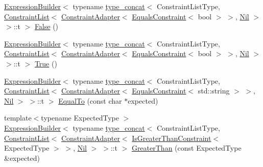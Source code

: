 \begin{DoxyCompactItemize}
\item 
\mbox{\hyperlink{structsnowhouse_1_1ExpressionBuilder}{Expression\+Builder}}$<$ typename \mbox{\hyperlink{structsnowhouse_1_1type__concat}{type\+\_\+concat}}$<$ Constraint\+List\+Type, \mbox{\hyperlink{structsnowhouse_1_1ConstraintList}{Constraint\+List}}$<$ \mbox{\hyperlink{structsnowhouse_1_1ConstraintAdapter}{Constraint\+Adapter}}$<$ \mbox{\hyperlink{structsnowhouse_1_1EqualsConstraint}{Equals\+Constraint}}$<$ bool $>$ $>$, \mbox{\hyperlink{structsnowhouse_1_1Nil}{Nil}} $>$ $>$\+::t $>$ \mbox{\hyperlink{structsnowhouse_1_1ExpressionBuilder_a4d6100ada93a921ef65929572ac7a2d1}{False}} ()
\item 
\mbox{\hyperlink{structsnowhouse_1_1ExpressionBuilder}{Expression\+Builder}}$<$ typename \mbox{\hyperlink{structsnowhouse_1_1type__concat}{type\+\_\+concat}}$<$ Constraint\+List\+Type, \mbox{\hyperlink{structsnowhouse_1_1ConstraintList}{Constraint\+List}}$<$ \mbox{\hyperlink{structsnowhouse_1_1ConstraintAdapter}{Constraint\+Adapter}}$<$ \mbox{\hyperlink{structsnowhouse_1_1EqualsConstraint}{Equals\+Constraint}}$<$ bool $>$ $>$, \mbox{\hyperlink{structsnowhouse_1_1Nil}{Nil}} $>$ $>$\+::t $>$ \mbox{\hyperlink{structsnowhouse_1_1ExpressionBuilder_a6fbd324a200c305ed4fe83aa1143a7ab}{True}} ()
\item 
\mbox{\hyperlink{structsnowhouse_1_1ExpressionBuilder}{Expression\+Builder}}$<$ typename \mbox{\hyperlink{structsnowhouse_1_1type__concat}{type\+\_\+concat}}$<$ Constraint\+List\+Type, \mbox{\hyperlink{structsnowhouse_1_1ConstraintList}{Constraint\+List}}$<$ \mbox{\hyperlink{structsnowhouse_1_1ConstraintAdapter}{Constraint\+Adapter}}$<$ \mbox{\hyperlink{structsnowhouse_1_1EqualsConstraint}{Equals\+Constraint}}$<$ std\+::string $>$ $>$, \mbox{\hyperlink{structsnowhouse_1_1Nil}{Nil}} $>$ $>$\+::t $>$ \mbox{\hyperlink{structsnowhouse_1_1ExpressionBuilder_af4bface30b14ef54c89f50dcd9bc38c5}{Equal\+To}} (const char $\ast$expected)
\item 
{\footnotesize template$<$typename Expected\+Type $>$ }\\\mbox{\hyperlink{structsnowhouse_1_1ExpressionBuilder}{Expression\+Builder}}$<$ typename \mbox{\hyperlink{structsnowhouse_1_1type__concat}{type\+\_\+concat}}$<$ Constraint\+List\+Type, \mbox{\hyperlink{structsnowhouse_1_1ConstraintList}{Constraint\+List}}$<$ \mbox{\hyperlink{structsnowhouse_1_1ConstraintAdapter}{Constraint\+Adapter}}$<$ \mbox{\hyperlink{structsnowhouse_1_1IsGreaterThanConstraint}{Is\+Greater\+Than\+Constraint}}$<$ Expected\+Type $>$ $>$, \mbox{\hyperlink{structsnowhouse_1_1Nil}{Nil}} $>$ $>$\+::t $>$ \mbox{\hyperlink{structsnowhouse_1_1ExpressionBuilder_a8f184e5dc6b985e01a0b41a9a7312a60}{Greater\+Than}} (const Expected\+Type \&expected)

\end{DoxyCompactItemize}
